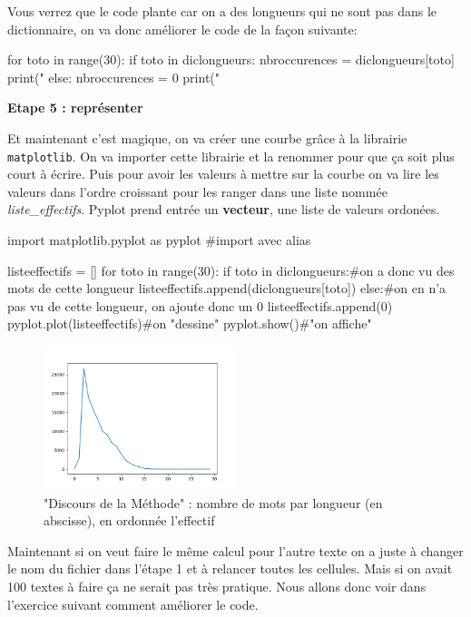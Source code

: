 Vous verrez que le code plante car on a des longueurs qui ne sont
pas dans le dictionnaire, on va donc améliorer le code de la façon
suivante:

\begin{python} for toto in range(30): if toto in diclongueurs: nbroccurences
= diclongueurs{[}toto{]} print("%
 else: nbroccurences = 0 print("%
\end{python}

\textbf{Etape 5 : représenter}

Et maintenant c'est magique, on va créer une courbe grâce à la librairie
\texttt{matplotlib}. On va importer cette librairie et la renommer
pour que ça soit plus court à écrire. Puis pour avoir les valeurs
à mettre sur la courbe on va lire les valeurs dans l'ordre croissant
pour les ranger dans une liste nommée \textit{liste\_effectifs}. Pyplot
prend entrée un \textbf{vecteur}, une liste de valeurs ordonées.

\begin{python} import matplotlib.pyplot as pyplot \#import avec alias

listeeffectifs = {[}{]} for toto in range(30): if toto in diclongueurs:\#on
a donc vu des mots de cette longueur listeeffectifs.append(diclongueurs{[}toto{]})
else:\#on en n'a pas vu de cette longueur, on ajoute donc un 0 listeeffectifs.append(0)
pyplot.plot(listeeffectifs)\#on "dessine" pyplot.show()\#"on affiche"

\end{python}

\begin{figure}
\centering{}
\includegraphics[width=0.5\textwidth]{../images/TD1_effectifs1.png}
\caption{"Discours de la Méthode" : nombre de mots par longueur (en abscisse),
en ordonnée l'effectif}
\end{figure}

Maintenant si on veut faire le même calcul pour l'autre texte on a
juste à changer le nom du fichier dans l'étape 1 et à relancer toutes
les cellules. Mais si on avait 100 textes à faire ça ne serait pas
très pratique. Nous allons donc voir dans l'exercice suivant comment
améliorer le code.
